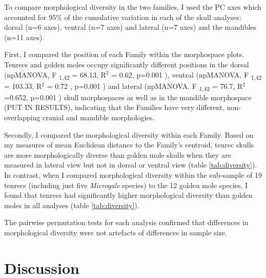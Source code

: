 	To compare morphological diversity in the two families, I used the PC axes which accounted for 95\% of the cumulative variation in each of the skull analyses: dorsal (n=6 axes), ventral (n=7 axes) and lateral (n=7 axes) and the mandibles (n=11 axes).
	
	First, I compared the position of each Family within the morphospace plots. Tenrecs and golden moles occupy significantly different positions in the dorsal 	(npMANOVA, F \textsubscript{1,42} = 68.13, R$^2$ = 0.62, p=0.001 ), ventral (npMANOVA, F \textsubscript{1,42} = 103.33, R$^2$ = 0.72 , p=0.001 ) and lateral (npMANOVA, F \textsubscript{1,42} = 76.7, R$^2$=0.652, p=0.001 ) skull morphospaces as well as in the mandible morphospace (PUT IN RESULTS),  indicating that the Families have very different, non-overlapping cranial and mandible morphologies. 
	

	Secondly, I compared the morphological diversity within each Family. Based on my measures of mean Euclidean distance to the Family's centroid, tenrec skulls are more morphologically diverse than golden mole skulls when they are measured in lateral view but not in dorsal or ventral view (table \ref{tab:diversity}). In contrast, when I compared morphological diversity within the sub-sample of 19 tenrecs (including just five \textit{Microgale} species) to the 12 golden mole species, I found that tenrecs had significantly higher morphological diversity than golden moles in all analyses (table \ref{tab:diversity}).
	

	The pairwise permutation tests for each analysis confirmed that differences in morphological diversity were not artefacts of differences in sample size.

	\begin{table}[h]			
	\caption[Comparison of morphological diversity in tenrecs and golden moles.]
	 
	\label{tab:diversity}  
	\end{table}

		

	

\section{Discussion}





